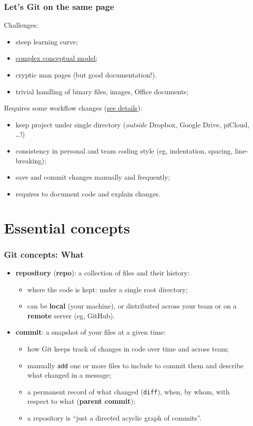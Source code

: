 \documentclass[10pt,svgnames,handout]{beamer}
\begin{document}
\begin{frame}
\frametitle{Let's Git on the same page}
\label{git_cons}

Challenges:
\begin{itemize}
  \item steep learning curve;
  \item \hyperlink{xkcd_git}{complex conceptual model};
  \item cryptic man pages (but good documentation!).
  \item trivial handling of binary files, images, Office documents;
\end{itemize}

\medskip
\pause 

Requires some workflow changes (\hyperlink{style}{see details}):
\begin{itemize}
  \item keep project under single directory (\emph{outside} Dropbox, Google Drive, piCloud, \ldots!)
  \item consistency in personal and team coding style (eg, indentation, spacing, line-breaking);
  \item save and commit changes manually and frequently;
  \item requires to document code and explain changes.
\end{itemize}
\end{frame}


\section{Essential concepts}
\begin{frame}
\frametitle{Git concepts: What}
    
\begin{itemize}[<+->]
\item \textbf{repository} (\textbf{repo}): a collection of files and their history:
\begin{itemize}
   \item where the code is kept: under a single root directory;
   \item can be \textbf{local} (your machine), or distributed across your team or on a \textbf{remote} server (eg, GitHub).
 \end{itemize}

\item \textbf{commit}: a snapshot of your files at a given time:
\begin{itemize}
  \item how Git keeps track of changes in code over time and across team;
  \item manually \lstinline{add} one or more files to include to commit them and describe what changed in a message;
  \item a permanent record of what changed (\lstinline{diff}), when, by whom, with respect to what (\textbf{parent commit});
  \item a repository is “just a directed acyclic graph of commits”.
\end{itemize}
\end{itemize}
\end{frame}
\end{document}

